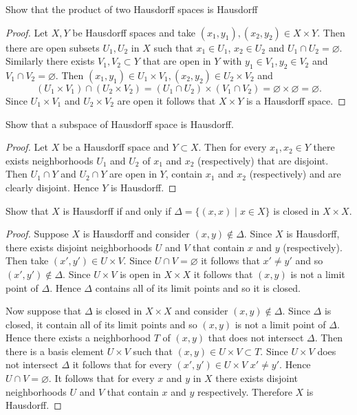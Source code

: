 \begin{ex}{17.8}
    
\end{ex}

\begin{ex}{17.11}
    Show that the product of two Hausdorff spaces is Hausdorff
\end{ex}
\begin{proof}
    Let $X,Y$ be Hausdorff spaces and take $(x_1,y_1),(x_2, y_2)\in X\times Y$.
    Then there are open subsets $U_1,U_2$ in $X$ such that $x_1\in U_1$, $x_2\in U_2$ and $U_1\cap U_2=\varnothing$.
    Similarly there exists $V_1,V_2\subset Y$ that are open in $Y$ with $y_1\in V_1, y_2\in V_2$ and $V_1\cap V_2=\varnothing$.
    Then $(x_1,y_1)\in U_1\times V_1, (x_2,y_2)\in U_2\times V_2$ and
    $$\left(U_1\times V_1\right)\cap\left(U_2\times V_2\right)=\left(U_1\cap U_2\right)\times\left(V_1\cap V_2\right)=\varnothing\times\varnothing=\varnothing.$$
    Since $U_1\times V_1$ and $U_2\times V_2$ are open it follows that $X\times Y$ is a Hausdorff space.
\end{proof}

\begin{ex}{17.12}
    Show that a subspace of Hausdorff space is Hausdorff.
\end{ex}
\begin{proof}
    Let $X$ be a Hausdorff space and $Y\subset X$. Then for every $x_1, x_2\in Y$ there exists neighborhoods $U_1$ and $U_2$ of $x_1$ and $x_2$ (respectively) that are disjoint.
    Then $U_1\cap Y$ and $U_2\cap Y$ are open in $Y$, contain $x_1$ and $x_2$ (respectively) and are clearly disjoint. Hence $Y$ is Hausdorff.
\end{proof}

\begin{ex}{17.13}
    Show that $X$ is Hausdorff if and only if $\Delta = \{(x,x)\mid x\in X\}$ is closed in $X\times X$.
\end{ex}
\begin{proof}
    Suppose $X$ is Hausdorff and consider $(x,y)\not\in\Delta$. Since $X$ is Hausdorff, there exists disjoint neighborhoods $U$ and $V$ that contain $x$ and $y$ (respectively).
    Then take $(x', y')\in U\times V$. Since $U\cap V=\varnothing$ it follows that $x'\neq y'$ and so $(x',y')\not\in\Delta$.
    Since $U\times V$ is open in $X\times X$ it follows that $(x,y)$ is not a limit point of $\Delta$. Hence $\Delta$ contains all of its limit points and so it is closed.

    Now suppose that $\Delta$ is closed in $X\times X$ and consider $(x,y)\not\in\Delta$. Since $\Delta$ is closed, it contain all of its limit points and so $(x,y)$ is not a limit point of $\Delta$. 
    Hence there exists a neighborhood $T$ of $(x,y)$ that does not intersect $\Delta$. Then there is a basis element $U\times V$ such that $(x,y)\in U\times V\subset T$.
    Since $U\times V$ does not intersect $\Delta$ it follows that for every $(x', y')\in U\times V$ $x'\neq y'$. Hence $U\cap V=\varnothing$. 
    It follows that for every $x$ and $y$ in $X$ there exists disjoint neighborhoods $U$ and $V$ that contain $x$ and $y$ respectively. Therefore $X$ is Hausdorff.
\end{proof}

